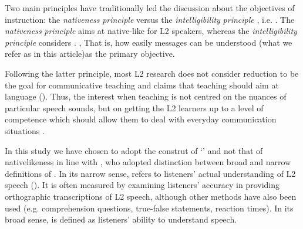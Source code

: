 \documentclass[output=paper]{langsci/langscibook}
\begin{document}
Two main principles have traditionally led the discussion about the objectives of  instruction: the \textit{nativeness} \textit{principle} versus the \textit{intelligibility} \textit{principle} \citep{Levis2005}, i.e. . The \textit{nativeness} \textit{principle} aims at native-like  for {L2} speakers, whereas the \textit{intelligibility} \textit{principle} considers . , That is, how easily messages can be understood (what we refer as  in this article)as the primary objective. 

Following the latter principle, most {L2}  research does not consider  reduction to be the goal for communicative teaching and claims that  teaching should aim at language  (\citealt{Kenworthy1987,Pennington1996,Derwing2008,Thomson2013}). Thus, the interest when teaching  is not centred on the nuances of particular speech sounds, but on getting the {L2} learners up to a level of competence which should allow them to deal with everyday communication situations \citep{Gimson1994}. 

In this study we have chosen to adopt the construt of ‘’ and not that of nativelikeness  in line with \citet{IsaacsTrofimovich2012}, who adopted  distinction between broad and narrow definitions of . In its narrow sense,  refers to listeners’ actual understanding of {L2} speech (\citealt{MunroDerwing1999}). It is often measured by examining listeners’ accuracy in providing orthographic transcriptions of {L2} speech, although other methods have also been used (e.g. comprehension questions, true-false statements, reaction times). In its broad sense,  is defined as listeners’ ability to understand speech. 
\end{document}
